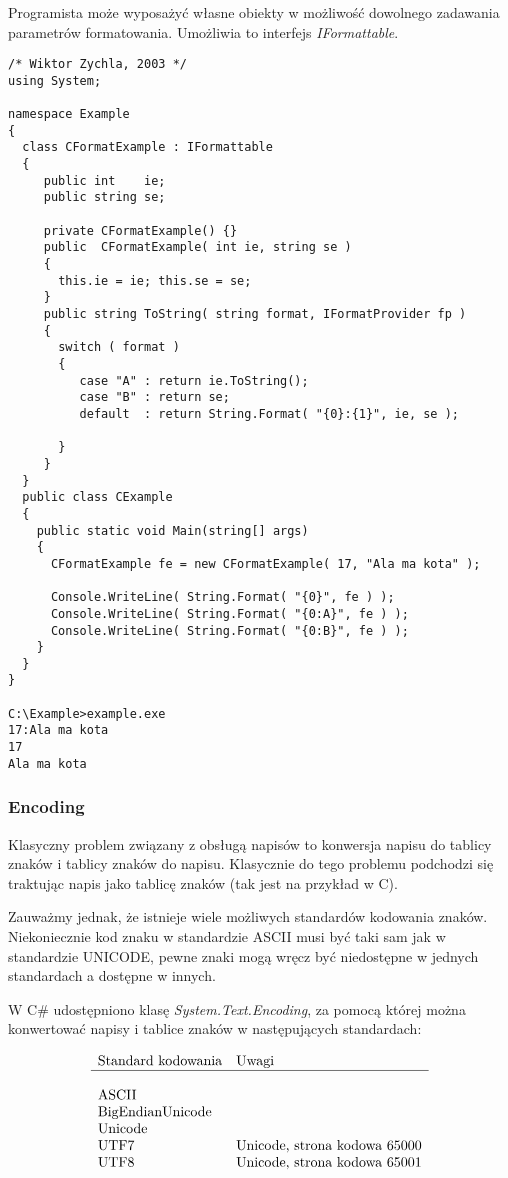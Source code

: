 Programista może wyposażyć własne obiekty w możliwość dowolnego zadawania parametrów formatowania. 
Umożliwia to interfejs {\em IFormattable}.

\begin{scriptsize}
\begin{verbatim}
/* Wiktor Zychla, 2003 */
using System;

namespace Example
{
  class CFormatExample : IFormattable
  {
     public int    ie;
     public string se;

     private CFormatExample() {}
     public  CFormatExample( int ie, string se )
     {
       this.ie = ie; this.se = se;
     }
     public string ToString( string format, IFormatProvider fp )
     {
       switch ( format )
       {
          case "A" : return ie.ToString();
          case "B" : return se;
          default  : return String.Format( "{0}:{1}", ie, se );

       } 
     } 
  }
  public class CExample 
  {
    public static void Main(string[] args)
    {
      CFormatExample fe = new CFormatExample( 17, "Ala ma kota" );
       
      Console.WriteLine( String.Format( "{0}", fe ) );
      Console.WriteLine( String.Format( "{0:A}", fe ) );
      Console.WriteLine( String.Format( "{0:B}", fe ) );
    }
  }
}

C:\Example>example.exe
17:Ala ma kota
17
Ala ma kota
\end{verbatim}
\end{scriptsize}


\subsubsection{Encoding}

Klasyczny problem związany z obsługą napisów to konwersja napisu do tablicy znaków i tablicy znaków do
napisu. Klasycznie do tego problemu podchodzi się traktując napis jako tablicę znaków (tak jest na przykład
w C).

Zauważmy jednak, że istnieje wiele możliwych standardów kodowania znaków. Niekoniecznie kod znaku w standardzie
ASCII musi być taki sam jak w standardzie UNICODE, pewne znaki mogą wręcz być niedostępne w jednych standardach
a dostępne w innych.

W C\# udostępniono klasę {\em System.Text.Encoding}, za pomocą której można konwertować napisy i tablice
znaków w następujących standardach:

\begin{center}
$$\begin{array}{ll}
\mbox{Standard kodowania} & \mbox{Uwagi}  \\
\hline \\
\mbox{ASCII} & \mbox{}   \\
\mbox{BigEndianUnicode} & \mbox{}  \\
\mbox{Unicode} & \mbox{} \\
\mbox{UTF7} & \mbox{Unicode, strona kodowa 65000} \\
\mbox{UTF8} & \mbox{Unicode, strona kodowa 65001}
\end{array}$$
\end{center}


